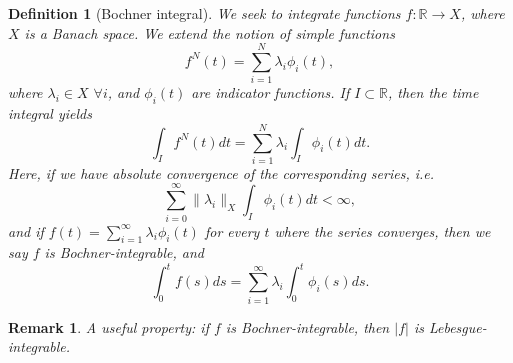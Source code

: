 \documentclass{article}
\newtheorem{remark}{Remark}
\newtheorem{definition}{Definition}
\newcommand{\R}{\mathbb{R}}
\begin{document}
\begin{definition}[Bochner integral]
We seek to integrate functions $f:\R\to X$, where $X$ is a Banach space. We extend the notion of simple functions
\begin{equation*}
    f^N(t) = \sum_{i=1}^N \lambda_i \phi_i(t),
\end{equation*}
where $\lambda_i \in X$ $\forall i$, and $\phi_i(t)$ are indicator functions. If $I\subset \R$, then the time integral yields
\begin{equation*}
    \int_I f^N(t) dt = \sum_{i=1}^N \lambda_i \int_I \phi_i(t) dt.
\end{equation*}
Here, if we have absolute convergence of the corresponding series, i.e. 
\begin{equation*}
    \sum_{i=0}^{\infty} \|\lambda_i\|_X \int_I \phi_i(t)dt <\infty,
\end{equation*}
and if $f(t) = \sum_{i=1}^{\infty} \lambda_i \phi_i(t)$ for every $t$ where the series converges, then we say $f$ is Bochner-integrable, and
\begin{equation*}
    \int_0^t f(s)ds = \sum_{i=1}^\infty \lambda_i \int_0^t \phi_i(s)ds.
\end{equation*}    
\end{definition}
\begin{remark}
    A useful property: if $f$ is Bochner-integrable, then $|f|$ is Lebesgue-integrable. 
\end{remark}
\end{document}
